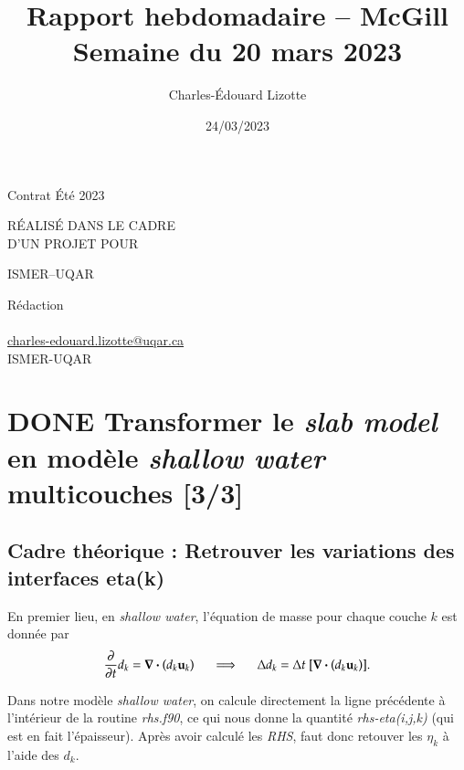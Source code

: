 \documentclass[10pt]{article}
\author{Charles-Édouard Lizotte}
\date{24/03/2023}
\title{Rapport hebdomadaire -- McGill\\\medskip
\large Semaine du 20 mars 2023}
\makeatletter
\numberwithin{equation}{section}
\newcommand{\mytitlepage}{
\begin{titlepage}
\begin{center}
{\Large Contrat Été 2023 \par}
\vspace{2cm}
{\Large \MakeUppercase{\thetitle} \par}
\vspace{2cm}
RÉALISÉ DANS LE CADRE\\ D'UN PROJET POUR \par
\vspace{2cm}
{\Large ISMER--UQAR \par}
\vspace{2cm}
{\thedate}
\end{center}
\vfill
Rédaction \\
{\theauthor}\\
\url{charles-edouard.lizotte@uqar.ca}\\
ISMER-UQAR
\end{titlepage}
}
\makeatother
\begin{document}
\mytitlepage
\tableofcontents\newpage

\section{{\bfseries\sffamily DONE} Transformer le \emph{slab model} en modèle \emph{shallow water} multicouches [3/3]}
\label{sec:org8b42ecf}
\subsection{\textbf{Cadre théorique} : Retrouver les variations des interfaces eta(k)}
\label{sec:org67649a2}
En premier lieu, en \emph{shallow water}, l'équation de masse pour chaque couche \(k\) est donnée par
\begin{equation}
\pdv{}{t} d_k = \divergence (d_k\vb{u}_k)
\hspace{0.5cm}\Longrightarrow\hspace{0.5cm}
\Delta d_k = \Delta t \ \qty[ \divergence (d_k \vb{u}_k)].
\end{equation}

Dans notre modèle \emph{shallow water}, on calcule directement la ligne précédente à l'intérieur de la routine \emph{rhs.f90}, ce qui nous donne la quantité \emph{rhs-eta(i,j,k)} (qui est en fait l'épaisseur).
Après avoir calculé les \emph{RHS}, faut donc retouver les \(\eta_k\) à l'aide des \(d_k\).
\end{document}
